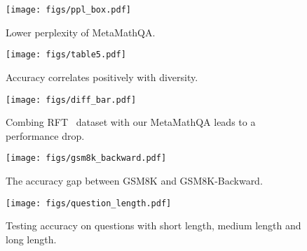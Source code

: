     
  

    \begin{figure}[!b]
    \begin{minipage}{0.44\linewidth}
    \vspace{-1em}
    \centering
    \texttt{[image: figs/ppl\_box.pdf]}
    \vspace{-1.85em}
	\caption{\footnotesize  Lower perplexity of MetaMathQA.}
	\label{fig:perplexity}
    \vspace{-0.5em}
    \end{minipage}
    \hfill
    \begin{minipage}{0.54\linewidth}
    \vspace{-1em}
    \centering
    \texttt{[image: figs/table5.pdf]}
    \vspace{-2.18em}
	\caption{\footnotesize  Accuracy correlates positively with diversity.}
	\label{fig:DiversityGains}
    \vspace{-0.5em}
    \end{minipage}
    \end{figure}

        \begin{figure}[b]
    \begin{minipage}{0.3\linewidth}
    \centering
    \vspace{-1.2em}
    \texttt{[image: figs/diff\_bar.pdf]}
    \vspace{-1.8em}
	\caption{\footnotesize Combing RFT~\citep{yuan2023scaling} dataset with our MetaMathQA leads to a performance drop.}
	\label{fig:Less is More}
    \vspace{-0.7em}
    \end{minipage}
    \hfill
    \begin{minipage}{0.3\linewidth}
    \centering
    \vspace{-1.2em}
    \texttt{[image: figs/gsm8k\_backward.pdf]}
    \vspace{-1.8em}
	\caption{\footnotesize The accuracy gap between GSM8K and GSM8K-Backward.}
	\label{fig:reverse}
    \vspace{-0.7em}
    \end{minipage}
    \hfill
    \begin{minipage}{0.3\linewidth}
    \centering
    \vspace{-1.2em}
    \texttt{[image: figs/question\_length.pdf]}
    \vspace{-1.8em}
	\caption{\footnotesize Testing accuracy on questions with short length, medium length and long length.}
	\label{fig:erroranalysis}
    \vspace{-0.7em}
    \end{minipage}
    \end{figure}

